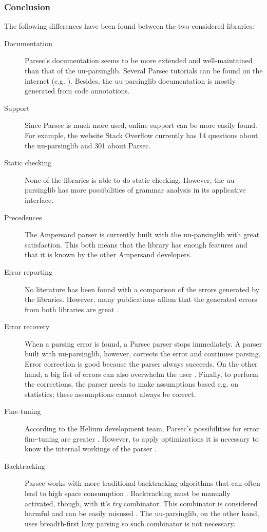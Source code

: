 \subsubsection{Conclusion}
The following differences have been found between the two considered libraries:
\begin{description}
	\item[Documentation] Parsec's documentation seems to be more extended and well-maintained than that of the uu-parsinglib.
		Several Parsec tutorials can be found on the internet (e.g. ).
		Besides, the uu-parsinglib documentation is mostly generated from code annotations.
	\item[Support] Since Parsec is much more used, online support can be more easily found.
		For example, the website Stack Overflow currently has 14 questions about the uu-parsinglib and 301 about Parsec.
	\item[Static checking] None of the libraries is able to do static checking.
		However, the uu-parsinglib has more possibilities of grammar analysis in its applicative interface.
	\item[Precedences] The Ampersand parser is currently built with the uu-parsinglib with great satisfaction.
		This both means that the library has enough features and that it is known by the other Ampersand developers.
	\item[Error reporting] No literature has been found with a comparison of the errors generated by the libraries.
		However, many publications affirm that the generated errors from both libraries are great .
	\item[Error recovery] When a parsing error is found, a Parsec parser stops immediately.
		A parser built with uu-parsinglib, however, corrects the error and continues parsing.
		Error correction is good because the parser always succeeds.
		On the other hand, a big list of errors can also overwhelm the user .
		Finally, to perform the corrections, the parser needs to make assumptions based e.g. on statistics;
		these assumptions cannot always be correct.
	\item[Fine-tuning] According to the Helium development team, Parsec's possibilities for error fine-tuning are greater .
		However, to apply optimizations it is necessary to know the internal workings of the parser .
	\item[Backtracking] Parsec works with more traditional backtracking algorithms  that can often lead to high space consumption .
		Backtracking must be manually activated, though, with it's \textit{try} combinator.
    This combinator is considered harmful and can be easily misused .
		The uu-parsinglib, on the other hand, uses breadth-first lazy parsing  so such combinator is not necessary.
    

\end{description}
